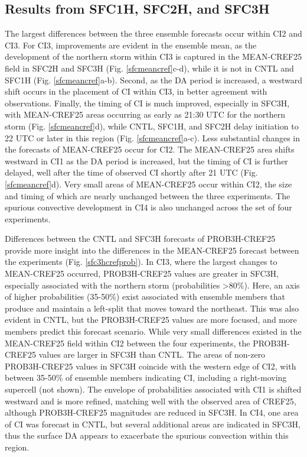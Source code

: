\subsection{Results from SFC1H, SFC2H, and SFC3H}
The largest differences between the three ensemble forecasts occur within CI2 and CI3. For CI3, improvements are evident in the ensemble mean, as the development of the northern storm within CI3 is captured in the MEAN-CREF25 field in SFC2H and SFC3H (Fig. \ref{sfcmeancref}c-d), while it is not in CNTL and SFC1H (Fig. \ref{sfcmeancref}a-b). Second, as the DA period is increased, a westward shift occurs in the placement of CI within CI3, in better agreement with observations. Finally, the timing of CI is much improved, especially in SFC3H, with MEAN-CREF25 areas occurring as early as 21:30 UTC for the northern storm (Fig. \ref{sfcmeancref}d), while CNTL, SFC1H, and SFC2H delay initiation to 22 UTC or later in this region (Fig. \ref{sfcmeancref}a-c). Less substantial changes in the forecasts of MEAN-CREF25 occur for CI2. The MEAN-CREF25 area shifts westward in CI1 as the DA period is increased, but the timing of CI is further delayed, well after the time of observed CI shortly after 21 UTC (Fig. \ref{sfcmeancref}d). Very small areas of MEAN-CREF25 occur within CI2, the size and timing of which are nearly unchanged between the three experiments. The spurious convective development in CI4 is also unchanged across the set of four experiments.

Differences between the CNTL and SFC3H forecasts of PROB3H-CREF25 provide more insight into the differences in the MEAN-CREF25 forecast between the experiments (Fig. \ref{sfc3hcrefprob}). In CI3, where the largest changes to MEAN-CREF25 occurred, PROB3H-CREF25 values are greater in SFC3H, especially associated with the northern storm (probabilities \textgreater 80\%). Here, an axis of higher probabilities (35-50\%) exist associated with ensemble members that produce and maintain a left-split that moves toward the northeast. This was also evident in CNTL, but the PROB3H-CREF25 values are more focused, and more members predict this forecast scenario. While very small differences existed in the MEAN-CREF25 field within CI2 between the four experiments, the PROB3H-CREF25 values are larger in SFC3H than CNTL. The areas of non-zero PROB3H-CREF25 values in SFC3H coincide with the western edge of CI2, with between 35-50\% of ensemble members indicating CI, including a right-moving supercell (not shown). The envelope of probabilities associated with CI1 is shifted westward and is more refined, matching well with the observed area of CREF25, although PROB3H-CREF25 magnitudes are reduced in SFC3H. In CI4, one area of CI was forecast in CNTL, but several additional areas are indicated in SFC3H, thus the surface DA appears to exacerbate the spurious convection within this region.

